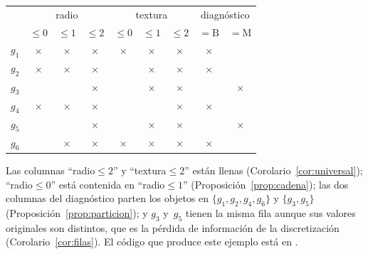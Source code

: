 \begin{center}
\small
\begin{tabular}{c|ccc|ccc|cc}
  & \multicolumn{3}{c|}{radio} & \multicolumn{3}{c|}{textura} & \multicolumn{2}{c}{diagnóstico} \\
  & $\le 0$ & $\le 1$ & $\le 2$ & $\le 0$ & $\le 1$ & $\le 2$ & $=\mathrm{B}$ & $=\mathrm{M}$ \\ \hline
  $g_1$ & $\times$ & $\times$ & $\times$ & $\times$ & $\times$ & $\times$ & $\times$ &          \\
  $g_2$ & $\times$ & $\times$ & $\times$ &          & $\times$ & $\times$ & $\times$ &          \\
  $g_3$ &          &          & $\times$ &          & $\times$ & $\times$ &          & $\times$ \\
  $g_4$ & $\times$ & $\times$ & $\times$ &          &          & $\times$ & $\times$ &          \\
  $g_5$ &          &          & $\times$ &          & $\times$ & $\times$ &          & $\times$ \\
  $g_6$ &          & $\times$ & $\times$ & $\times$ & $\times$ & $\times$ & $\times$ &
\end{tabular}
\end{center}

Las columnas \enquote{radio${}\le 2$} y \enquote{textura${}\le 2$} están llenas (Corolario~\ref{cor:universal}); \enquote{radio${}\le 0$} está contenida en \enquote{radio${}\le 1$} (Proposición~\ref{prop:cadena}); las dos columnas del diagnóstico parten los objetos en $\{g_1, g_2, g_4, g_6\}$ y $\{g_3, g_5\}$ (Proposición~\ref{prop:particion}); y $g_3$ y~$g_5$ tienen la misma fila aunque sus valores originales son distintos, que es la pérdida de información de la discretización (Corolario~\ref{cor:filas}). El código que produce este ejemplo está en .

